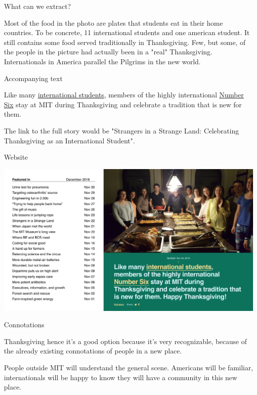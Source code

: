 \documentclass[10pt]{beamer}
\begin{document}
\begin{frame}{What can we extract?}

Most of the food in the photo are plates that students eat in their home countries.
To be concrete, 11 international students and one american student. 
It still contains some food served traditionally in Thanksgiving.
Few, but some, of the people in the picture had actually been in a "real" Thanksgiving. 
Internationals in America parallel the Pilgrims in the new world.


\end{frame}

\begin{frame}{Accompanying text}

Like many \href{http://iso.mit.edu}{international students}, members of the highly
international \href{http://no6.mit.edu}{Number Six} stay at MIT during Thanksgiving and celebrate
a tradition that is new for them.

The link to the full story would be "Strangers in a Strange Land: Celebrating 
Thanksgiving as an International Student".

\end{frame}

\begin{frame}{Website}

\begin{center}
  \includegraphics[scale=0.2]{Thanksgiving_website.png}
\end{center}

\end{frame}

\begin{frame}{Connotations}


Thanksgiving hence it's a good option because it's very recognizable, because of the 
already existing connotations of people in a new place.

People outside MIT will understand the general scene.
Americans will be familiar, internationals will be happy to know they will have a 
community in this new place.

\end{frame}
\end{document}
